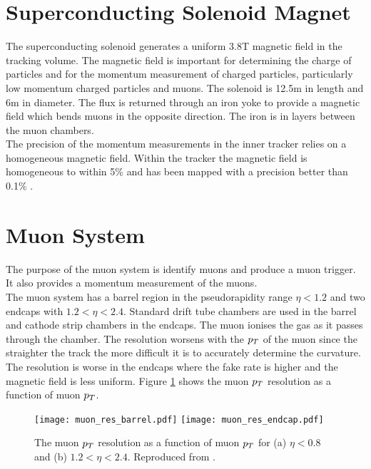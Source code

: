 \section{Superconducting Solenoid Magnet}

The superconducting solenoid generates a uniform 3.8T magnetic field in the
tracking volume. The magnetic field is important for determining the charge of 
particles and for the momentum measurement of charged particles, particularly 
low momentum charged particles and muons. The solenoid is 12.5m in length and 6m 
in diameter. The flux is returned through an iron yoke to provide a magnetic 
field which bends muons in the opposite direction. The iron is in layers between 
the muon chambers. \\

The precision of the momentum measurements in the inner tracker relies on a
homogeneous magnetic field. Within the tracker the magnetic field is homogeneous
to within 5\% \cite{field_measurement} and has been mapped with a precision 
better than 0.1\% \cite{field_uniformity}.

\section{Muon System}

The purpose of the muon system is identify muons and produce a muon trigger. It
also provides a momentum measurement of the muons. \\

The muon system has a barrel region in the pseudorapidity range $\eta < 1.2$ and
two endcaps with $1.2 < \eta < 2.4$. Standard drift tube chambers are used in
the barrel and cathode strip chambers in the endcaps. The muon ionises the gas 
as it passes through the chamber. The resolution worsens with the $p_{T}$ of the
muon since the straighter the track the more difficult it is to accurately 
determine the curvature. The resolution is worse in the endcaps where the fake 
rate is higher and the magnetic field is less uniform. Figure 
\ref{fig:muon_resolution} shows the muon $p_{T}$ resolution as a function of muon
$p_{T}$.

\begin{figure}
\texttt{[image: muon\_res\_barrel.pdf]}
\texttt{[image: muon\_res\_endcap.pdf]}
\caption{The muon $p_{T}$ resolution as a function of muon $p_{T}$ for (a) $\eta <
0.8$ and (b) $1.2 < \eta < 2.4$. Reproduced from \cite{muon_resolution}.}
\label{fig:muon_resolution}
\end{figure}

